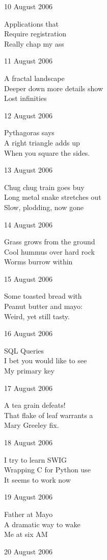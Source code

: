 \documentclass[12pt]{article}
\begin{document}
10 August 2006

Applications that \\
Require registration \\
Really chap my ass

11 August 2006

A fractal landscape \\
Deeper down more details show \\
Lost infinities

12 August 2006

Pythagoras says \\
A right triangle adds up \\
When you square the sides.

13 August 2006

Chug chug train goes buy \\
Long metal snake stretches out \\
Slow, plodding, now gone


\newpage

14 August 2006

Grass grows from the ground \\
Cool hummus over hard rock \\
Worms burrow within

15 August 2006

Some toasted bread with \\
Peanut butter and mayo: \\
Weird, yet still tasty.

16 August 2006

SQL Queries \\
I bet you would like to see \\
My primary key

17 August 2006

A tea grain defeats! \\
That flake of leaf warrants a \\
Mary Greeley fix.

18 August 2006

I try to learn SWIG \\
Wrapping C for Python use \\
It seems to work now

19 August 2006

Father at Mayo \\
A dramatic way to wake \\
Me at six AM


\newpage

20 August 2006
\end{document}
